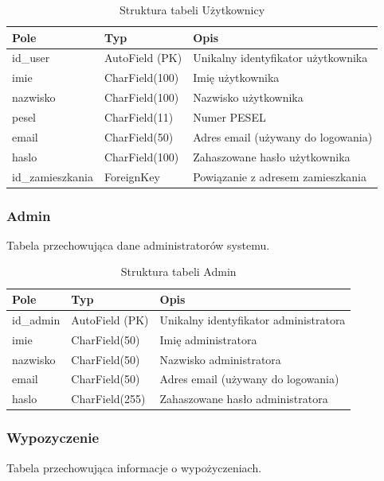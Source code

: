 \documentclass[12pt,a4paper]{article}
\begin{document}
\begin{table}[H]
\centering
\begin{tabular}{|l|l|p{7cm}|}
\hline
\textbf{Pole} & \textbf{Typ} & \textbf{Opis} \\
\hline
id\_user & AutoField (PK) & Unikalny identyfikator użytkownika \\
\hline
imie & CharField(100) & Imię użytkownika \\
\hline
nazwisko & CharField(100) & Nazwisko użytkownika \\
\hline
pesel & CharField(11) & Numer PESEL \\
\hline
email & CharField(50) & Adres email (używany do logowania) \\
\hline
haslo & CharField(100) & Zahaszowane hasło użytkownika \\
\hline
id\_zamieszkania & ForeignKey & Powiązanie z adresem zamieszkania \\
\hline
\end{tabular}
\caption{Struktura tabeli Użytkownicy}
\end{table}

\subsubsection{Admin}
Tabela przechowująca dane administratorów systemu.

\begin{table}[H]
\centering
\begin{tabular}{|l|l|p{7cm}|}
\hline
\textbf{Pole} & \textbf{Typ} & \textbf{Opis} \\
\hline
id\_admin & AutoField (PK) & Unikalny identyfikator administratora \\
\hline
imie & CharField(50) & Imię administratora \\
\hline
nazwisko & CharField(50) & Nazwisko administratora \\
\hline
email & CharField(50) & Adres email (używany do logowania) \\
\hline
haslo & CharField(255) & Zahaszowane hasło administratora \\
\hline
\end{tabular}
\caption{Struktura tabeli Admin}
\end{table}

\subsubsection{Wypozyczenie}
Tabela przechowująca informacje o wypożyczeniach.
\end{document}
